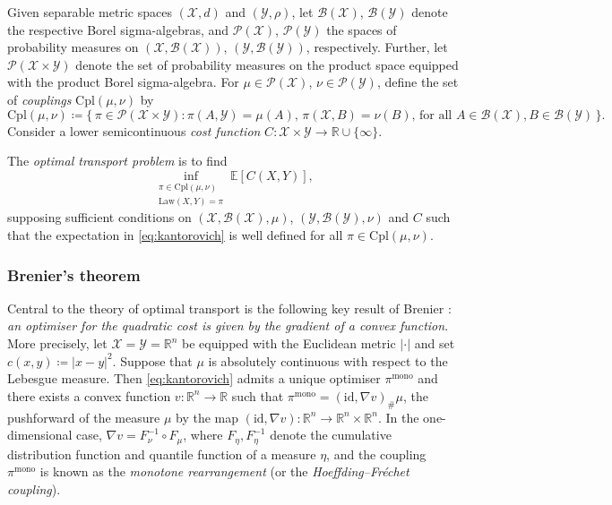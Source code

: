 \documentclass[onseside, final]{amsart}
\theoremstyle{definition}
\newcommand{\X}{\mathcal X}
\newcommand{\Y}{\mathcal Y}
\newcommand{\B}{\mathcal B}
\newcommand{\Pc}{\mathcal P}
\newcommand{\R}{\mathbb R}
\newcommand{\E}{\mathbb E}
\newcommand{\Law}{\mathrm{Law}}
\newcommand{\id}{\mathrm{id}}
\newcommand{\cpl}{\mathrm{Cpl}}
\newcommand{\mono}{\mathrm{mono}}
\numberwithin{equation}{section}
\begin{document}
		Given separable metric spaces $(\X, d)$ and $(\Y, \rho)$, let $\B(\X)$, $\B(\Y)$ denote the respective Borel sigma-algebras, and $\Pc(\X)$, $\Pc(\Y)$ the spaces of probability measures on $(\X, \B(\X))$, $(\Y, \B(\Y))$, respectively. Further, let $\Pc(\X \times \Y)$ denote the set of probability measures on the product space equipped with the product Borel sigma-algebra. For $\mu \in \Pc(\X)$, $\nu \in \Pc(\Y)$, define the set of \emph{couplings} $\cpl(\mu, \nu)$ by
		\begin{equation}
			\cpl(\mu, \nu) \coloneqq \{\, \pi \in \Pc(\X \times \Y) : \text{$\pi(A, \Y) = \mu(A)$, $\pi(\X, B) = \nu(B)$, for all $A \in \B(\X), B \in \B(\Y)$} \,\}.
		\end{equation}
		Consider a lower semicontinuous \emph{cost function} $C \colon \X \times \Y \to \R \cup \{\infty\}$.
		
		The \emph{optimal transport problem} \citep{Kant42} is to find
		\begin{equation}\label{eq:kantorovich}\tag{OT}
			\inf_{\substack{\pi \in \cpl(\mu, \nu)\\\Law(X, Y) = \pi}} \E[C(X, Y)],
		\end{equation}
		supposing sufficient conditions on $(\X, \B(\X), \mu)$, $(\Y, \B(\Y), \nu)$ and $C$ such that the expectation in \eqref{eq:kantorovich} is well defined for all $\pi \in \cpl(\mu, \nu)$.
		
		\subsubsection{Brenier's theorem}\label{sec:brenier}
			 Central to the theory of optimal transport is the following key result of Brenier \citep{Br91}: \emph{an optimiser for the quadratic cost is given by the gradient of a convex function}.
			 More precisely, let $\X = \Y = \R^n$ be equipped with the Euclidean metric $|\cdot|$ and set $c(x, y) \coloneqq |x - y|^2$. Suppose that $\mu$ is absolutely continuous with respect to the Lebesgue measure.
			 Then \eqref{eq:kantorovich} admits a unique optimiser $\pi^\mono$ and there exists a convex function $v\colon \R^n \to \R$ such that $\pi^\mono = (\id, \nabla v)_\#\mu$, the pushforward of the measure $\mu$ by the map $(\id, \nabla v)\colon \R^n \to \R^n \times \R^n$.
			 In the one-dimensional case, $\nabla v = F^{-1}_\nu \circ F_\mu$, where $F_\eta, F^{-1}_\eta$ denote the cumulative distribution function and quantile function of a measure $\eta$, and the coupling $\pi^\mono$ is known as the \emph{monotone rearrangement} (or the \emph{Hoeffding--Fr\'echet coupling}).
			 
\end{document}
